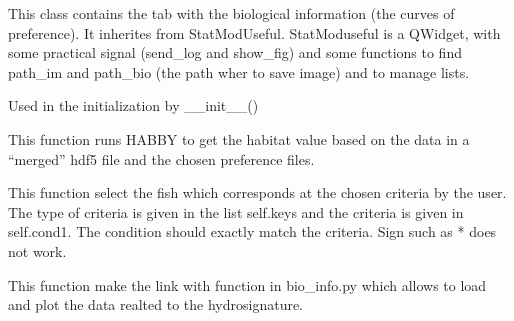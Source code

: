 \documentclass[letterpaper,10pt,english]{sphinxmanual}
\begin{document}
\begin{fulllineitems}
\label{\detokenize{index:src_GUI.bio_info_GUI.BioInfo}}
This class contains the tab with the biological information (the curves of preference). It inherites from
StatModUseful. StatModuseful is a QWidget, with some practical signal (send\_log and show\_fig) and some functions
to find path\_im and path\_bio (the path wher to save image) and to manage lists.

\begin{fulllineitems}
\label{\detokenize{index:src_GUI.bio_info_GUI.BioInfo.init_iu}}
Used in the initialization by \_\_init\_\_()

\end{fulllineitems}


\begin{fulllineitems}
\label{\detokenize{index:src_GUI.bio_info_GUI.BioInfo.run_habitat_value}}
This function runs HABBY to get the habitat value based on the data in a ``merged'' hdf5 file and the chosen
preference files.

\end{fulllineitems}


\begin{fulllineitems}
\label{\detokenize{index:src_GUI.bio_info_GUI.BioInfo.select_fish}}
This function select the fish which corresponds at the chosen criteria by the user. The type of criteria
is given in the list self.keys and the criteria is given in self.cond1. The condition should exactly
match the criteria. Sign such as * does not work.

\end{fulllineitems}


\begin{fulllineitems}
\label{\detokenize{index:src_GUI.bio_info_GUI.BioInfo.show_hydrosignature}}
This function make the link with function in bio\_info.py which allows to load and plot the data realted
to the hydrosignature.


\end{fulllineitems}
\end{fulllineitems}
\end{document}
